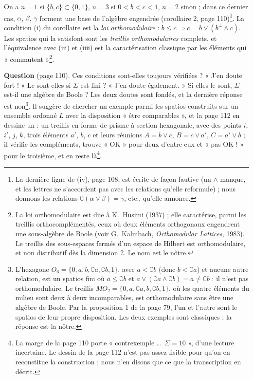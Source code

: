 \documentclass[11pt,a4paper]{article}
\begin{document}
On a $n = 1$ si $\{b, c\} \subset \{0, 1\}$, $n = 3$ si $0 < b < c < 1$, $n = 2$
sinon ; dans ce dernier cas, $\alpha$, $\beta$, $\gamma$ forment une base de
l'algèbre engendrée (corollaire 2, page 110)\footnote{La dernière ligne de (iv),
page 108, est écrite de façon fautive (un $\wedge$ manque, et les lettres ne
s'accordent pas avec les relations qu'elle reformule) ; nous donnons les relations
$\complement(\alpha \vee \beta) = \gamma$, etc., qu'elle annonce.}. La condition
(i) du corollaire est la \emph{loi orthomodulaire} : $b \leq c \Rightarrow c = b
\vee (b^{\perp} \wedge c)$. Les spatios qui la satisfont sont les \emph{treillis
orthomodulaires} complets, et l'équivalence avec (iii) et (iiii) est la
caractérisation classique par les éléments qui « commutent »\footnote{La loi
orthomodulaire est due à K.~Husimi (1937) ; elle caractérise, parmi les treillis
orthocomplémentés, ceux où deux éléments orthogonaux engendrent une sous-algèbre
de Boole (voir G.~Kalmbach, \emph{Orthomodular Lattices}, 1983). Le treillis des
sous-espaces fermés d'un espace de Hilbert est orthomodulaire, et non distributif
dès la dimension 2. Le nom est le nôtre.}.

\textbf{Question} (page 110). Ces conditions sont-elles toujours vérifiées ?
« J'en doute fort ! » Le sont-elles si $\Sigma$ est fini ? « J'en doute
également. » Si elles le sont, $\Sigma$ est-il une algèbre de Boole ? Les deux
doutes sont fondés, et la dernière réponse est non\footnote{L'hexagone $O_{6} =
\{0, a, b, \complement a, \complement b, 1\}$, avec $a < \complement b$ (donc $b
< \complement a$) et aucune autre relation, est un spatios fini où $a \leq
\complement b$ et $a \vee (\complement a \wedge \complement b) = a \neq
\complement b$ : il n'est pas orthomodulaire. Le treillis $MO_{2} = \{0, a,
\complement a, b, \complement b, 1\}$, où les quatre éléments du milieu sont deux
à deux incomparables, est orthomodulaire sans être une algèbre de Boole. Par la
proposition 1 de la page 79, l'un et l'autre sont le spatios de leur propre
disposition. Les deux exemples sont classiques ; la réponse est la nôtre.}. Il
suggère de chercher un exemple parmi les spatios construits sur un ensemble
ordonné $L$ avec la disposition « être comparables », et la page 112 en dessine
un : un treillis en forme de prisme à section hexagonale, avec des points $i$,
$i'$, $j$, $k$, trois éléments $a'$, $b$, $c$ et leurs réunions $A = b \vee c$,
$B = c \vee a'$, $C = a' \vee b$ ; il vérifie les compléments, trouve « OK » pour
deux d'entre eux et « pas OK ! » pour le troisième, et en reste là\footnote{La
marge de la page 110 porte « contrexemple \ldots\ $\Sigma = 10$ », d'une lecture
incertaine. Le dessin de la page 112 n'est pas assez lisible pour qu'on en
reconstitue la construction ; nous n'en disons que ce que la transcription en
décrit.}.
\end{document}
